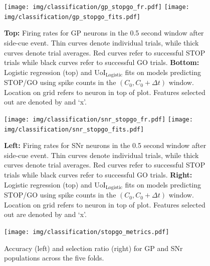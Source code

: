 \documentclass[11pt]{article}
\begin{document}
\begin{figure}[H]
	\centering
	\texttt{[image: img/classification/gp\_stopgo\_fr.pdf]}
	\texttt{[image: img/classification/gp\_stopgo\_fits.pdf]}
	\caption{\textbf{Top:} Firing rates for GP neurons in the 0.5 second window after side-cue event. Thin curves denote individual trials, while thick curves denote trial averages. Red curves refer to successful STOP trials while black curves refer to successful GO trials. \textbf{Bottom:} Logistic regression (top) and UoI$_{\text{Logistic}}$ fits on models predicting STOP/GO using spike counts in the $(C_0, C_0+\Delta t)$ window. Location on grid refers to neuron in top of plot. Features selected out are denoted by and `x'.}
	\label{fig:gp_stopgo}
\end{figure}

\begin{figure}[H]
	\centering
	\texttt{[image: img/classification/snr\_stopgo\_fr.pdf]}
	\texttt{[image: img/classification/snr\_stopgo\_fits.pdf]}
	\caption{\textbf{Left:} Firing rates for SNr neurons in the 0.5 second window after side-cue event. Thin curves denote individual trials, while thick curves denote trial averages. Red curves refer to successful STOP trials while black curves refer to successful GO trials. \textbf{Right:} Logistic regression (top) and UoI$_{\text{Logistic}}$ fits on models predicting STOP/GO using spike counts in the $(C_0, C_0+\Delta t)$ window. Location on grid refers to neuron in top of plot. Features selected out are denoted by and `x'.}
	\label{fig:snr_stopgo}
\end{figure}
\begin{figure}[H]
	\centering
	\texttt{[image: img/classification/stopgo\_metrics.pdf]}
	\caption{Accuracy (left) and selection ratio (right) for GP and SNr populations across the five folds.}
	\label{fig:stopgo_metrics}
\end{figure}
\end{document}
